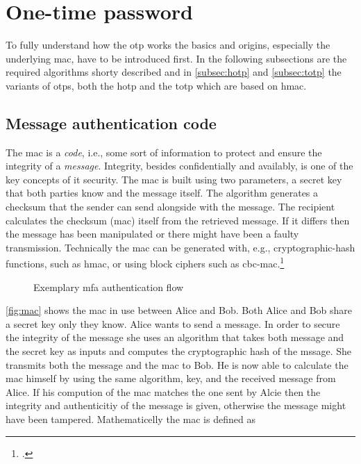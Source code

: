 \section{One-time password}

To fully understand how the \gls{otp} works the basics and origins, especially the underlying \gls{mac}, have to be introduced first. In the following subsections are the required algorithms shorty described and in \autoref{subsec:hotp} and \autoref{subsec:totp} the variants of \glspl{otp}, both the \gls{hotp} and the \gls{totp} which are based on \gls{hmac}.

\subsection{Message authentication code}

The \gls{mac} is a \textit{code}, i.e., some sort of information to protect and ensure the integrity of a \textit{message}. Integrity, besides confidentially and availably, is one of the key concepts of \gls{it} security. The \gls{mac} is built using two parameters, a secret key that both parties know and the message itself. The algorithm generates a checksum that the sender can send alongside with the message. The recipient calculates the checksum (\gls{mac}) itself from the retrieved message. If it differs then the message has been manipulated or there might have been a faulty transmission. Technically the \gls{mac} can be generated with, e.g., cryptographic-hash functions, such as \gls{hmac}, or using block ciphers such as \gls{cbc-mac}.\footcites[See][565]{320284}[See][163--168]{anderson2008security}[See][391-393]{eckert-it-sec-9}

\begin{figure}[hbt]
	\centering
	
	\caption[\gls{mac}]{Exemplary \gls{mfa} authentication flow\footnotemark}
	\label{fig:mac}
\end{figure}

\autoref{fig:mac} shows the \gls{mac} in use between Alice and Bob. Both Alice and Bob share a secret key only they know. Alice wants to send a message. In order to secure the integrity of the message she uses an algorithm that takes both message and the secret key as inputs and computes the cryptographic hash of the mssage. She transmits both the message and the \gls{mac} to Bob. He is now able to calculate the \gls{mac} himself by using the same algorithm, key, and the received message from Alice. If his compution of the \gls{mac} matches the one sent by Alcie then the integrity and authenticitiy of the message is given, otherwise the message might have been tampered. Mathematicelly the \gls{mac} is defined as

